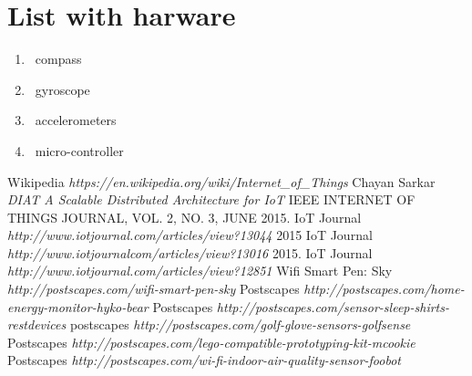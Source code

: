 \documentclass[12pt]{article}
\begin{document}
 \section {List with harware}

\begin{enumerate}
\item\ compass
\item\ gyroscope 
\item\ accelerometers
\item\ micro-controller

\end{enumerate}

 
 
 \begin{thebibliography}{1}
  Wikipedia \emph{https://en.wikipedia.org/wiki/Internet_of_Things}
  Chayan Sarkar \emph{DIAT A Scalable Distributed Architecture for IoT} IEEE INTERNET OF THINGS JOURNAL, VOL. 2, NO. 3, JUNE 2015.
  IoT Journal \emph{http://www.iotjournal.com/articles/view?13044} 2015
  IoT Journal \emph {http://www.iotjournalcom/articles/view?13016} 2015.
  IoT Journal \emph{http://www.iotjournal.com/articles/view?12851} 
  Wifi Smart Pen: Sky \emph{http://postscapes.com/wifi-smart-pen-sky} 
  Postscapes \emph{http://postscapes.com/home-energy-monitor-hyko-bear}
  Postscapes \emph{http://postscapes.com/sensor-sleep-shirts-restdevices}
  postscapes \emph {http://postscapes.com/golf-glove-sensors-golfsense}
  Postscapes \emph {http://postscapes.com/lego-compatible-prototyping-kit-mcookie}
  Postscapes \emph{http://postscapes.com/wi-fi-indoor-air-quality-sensor-foobot}

 \end{thebibliography}
\end{document}
